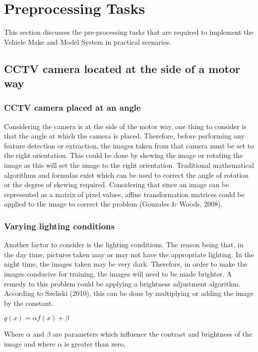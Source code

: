 \documentclass[a4paper, 16pt]{article}
\begin{document}
 \section{Preprocessing Tasks}
 This section discusses the pre-processing tasks that are required to implement the Vehicle Make and Model System in practical scenarios.
 
 \subsection{CCTV camera located at the side of a motor way}
 
 \subsubsection{CCTV camera placed at an angle}
Considering the camera is at the side of the motor way, one thing to consider is that the angle at which the camera is placed. Therefore, before performing any feature detection or extraction, the images taken from that camera must be set to the right orientation. This could be done by skewing the image or rotating the image as this will set the image to the right orientation. Traditional mathematical algorithms and formulas exist which can be used to correct the angle of rotation or the degree of skewing required. Considering that since an image can be represented as a matrix of pixel values, affine transformation matrices could be applied to the image to correct the problem (Gonzales \& Woods, 2008). 

\subsubsection{ Varying lighting conditions }
Another factor to consider is the lighting conditions. The reason being that, in the day time, pictures taken may or may not have the appropriate lighting. In the night time, the images taken may be very dark. Therefore, in order to make the images conducive for training, the images will need to be made brighter. A remedy to this problem could be applying a brightness adjustment algorithm. According to Szeliski (2010), this can be done by multiplying or adding the image by the constant. 

\begin{center}
 $g(x) = \alpha f(x) + \beta$
\end{center}

Where $\alpha$ and $\beta$ are parameters which influence the contrast and brightness of the image and where $\alpha$ is greater than zero. 
\end{document}
